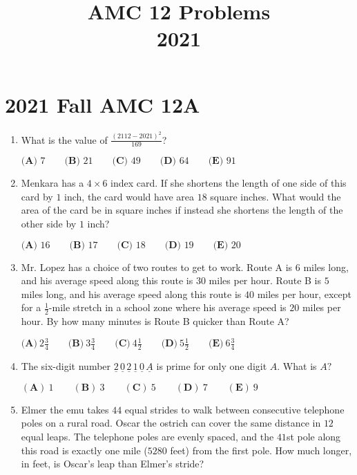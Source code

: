 \documentclass{article}
\title{AMC 12 Problems \\ 2021}
\date{}
\begin{document}
\maketitle\thispagestyle{fancy}\newpage\section*{2021 Fall AMC 12A}\begin{enumerate}[label=\arabic*., itemsep=0.5em]\item What is the value of \(\frac{(2112-2021)^2}{169}\)?

\(\textbf{(A) } 7 \qquad\textbf{(B) } 21 \qquad\textbf{(C) } 49 \qquad\textbf{(D) } 64 \qquad\textbf{(E) } 91\)\par \vspace{0.5em}\item Menkara has a \(4 \times 6\) index card. If she shortens the length of one side of this card by \(1\) inch, the card would have area \(18\) square inches. What would the area of the card be in square inches if instead she shortens the length of the other side by \(1\) inch?

\(\textbf{(A) }16\qquad\textbf{(B) }17\qquad\textbf{(C) }18\qquad\textbf{(D) }19\qquad\textbf{(E) }20\)\par \vspace{0.5em}\item Mr. Lopez has a choice of two routes to get to work. Route A is \(6\) miles long, and his average speed along this route is \(30\) miles per hour. Route B is \(5\) miles long, and his average speed along this route is \(40\) miles per hour, except for a \(\frac{1}{2}\)-mile stretch in a school zone where his average speed is \(20\) miles per hour. By how many minutes is Route B quicker than Route A?

\(\textbf{(A)}\ 2 \frac{3}{4}  \qquad\textbf{(B)}\  3 \frac{3}{4} \qquad\textbf{(C)}\  4 \frac{1}{2} \qquad\textbf{(D)}\
 5 \frac{1}{2} \qquad\textbf{(E)}\ 6 \frac{3}{4}\)\par \vspace{0.5em}\item The six-digit number \(\underline{2}\,\underline{0}\,\underline{2}\,\underline{1}\,\underline{0}\,\underline{A}\) is prime for only one digit \(A.\) What is \(A?\)

\((\textbf{A})\: 1\qquad(\textbf{B}) \: 3\qquad(\textbf{C}) \: 5 \qquad(\textbf{D}) \: 7\qquad(\textbf{E}) \: 9\)\par \vspace{0.5em}\item Elmer the emu takes \(44\) equal strides to walk between consecutive telephone poles on a rural road. Oscar the ostrich can cover the same distance in \(12\) equal leaps. The telephone poles are evenly spaced, and the \(41\)st pole along this road is exactly one mile (\(5280\) feet) from the first pole. How much longer, in feet, is Oscar's leap than Elmer's stride?


\end{enumerate}
\end{document}
